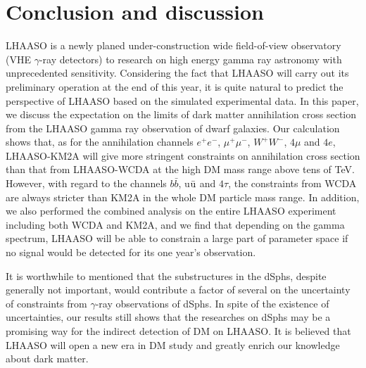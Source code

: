 \documentclass[12pt,prd,showpacs,amsmath,amssymb,aps,floats,floatfix,nofootinbib]{revtex4-1}
\begin{document}
\section{Conclusion and discussion}\label{sec conclu}
LHAASO is a newly planed under-construction wide field-of-view observatory (VHE $\gamma$-ray detectors) to research on high energy gamma ray astronomy with unprecedented sensitivity. Considering the fact that LHAASO will carry out its preliminary operation at the end of this year, it is quite natural to predict the perspective of LHAASO based on the simulated experimental data.
In this paper, we discuss the expectation on the limits of dark matter annihilation cross section from the LHAASO gamma ray observation of dwarf galaxies. Our calculation shows that, as for the annihilation channels $e^{+}e^{-}$, $\mu^{+}\mu^{-}$, $W^+W^-$, $4\mu$ and $4e$, LHAASO-KM2A will give more stringent constraints on annihilation cross section than that from LHAASO-WCDA at the high DM mass range above tens of TeV. However, with regard to the channels $b\bar{b}$, u$\bar{\rm u}$ and $4\tau$, the constraints from WCDA are always stricter than KM2A in the whole DM particle mass range.
In addition, we also performed the combined analysis on the entire LHAASO experiment including both WCDA and KM2A, and we find that depending on the gamma spectrum, LHAASO will be able to constrain a large part of parameter space if no signal would be detected for its one year's observation.

It is worthwhile to mentioned that the substructures in the dSphs, despite generally not important, would contribute a factor of several on the uncertainty of constraints from $\gamma$-ray observations of dSphs.
In spite of the existence of uncertainties, our results still shows that the researches on dSphs may be a promising way for the indirect detection of DM on LHAASO. It is believed that LHAASO will open a new era in DM study and greatly enrich our knowledge about dark matter.

\end{document}
